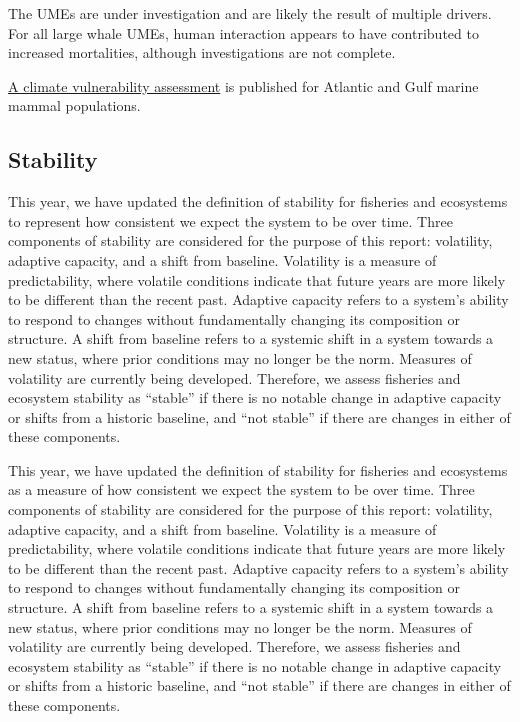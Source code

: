 \documentclass[
  10pt,
]{article}
\begin{document}
The UMEs are under investigation and are likely the result of multiple drivers. For all large whale UMEs, human interaction appears to have contributed to increased mortalities, although investigations are not complete.

\href{https://journals.plos.org/plosone/article?id=10.1371/journal.pone.0290643}{A climate vulnerability assessment} is published for Atlantic and Gulf marine mammal populations.

\newpage

\subsection{Stability}\label{stability}

This year, we have updated the definition of stability for fisheries and ecosystems to represent how consistent we expect the system to be over time. Three components of stability are considered for the purpose of this report: volatility, adaptive capacity, and a shift from baseline. Volatility is a measure of predictability, where volatile conditions indicate that future years are more likely to be different than the recent past. Adaptive capacity refers to a system's ability to respond to changes without fundamentally changing its composition or structure. A shift from baseline refers to a systemic shift in a system towards a new status, where prior conditions may no longer be the norm. Measures of volatility are currently being developed. Therefore, we assess fisheries and ecosystem stability as ``stable'' if there is no notable change in adaptive capacity or shifts from a historic baseline, and ``not stable'' if there are changes in either of these components.

This year, we have updated the definition of stability for fisheries and ecosystems as a measure of how consistent we expect the system to be over time. Three components of stability are considered for the purpose of this report: volatility, adaptive capacity, and a shift from baseline. Volatility is a measure of predictability, where volatile conditions indicate that future years are more likely to be different than the recent past. Adaptive capacity refers to a system's ability to respond to changes without fundamentally changing its composition or structure. A shift from baseline refers to a systemic shift in a system towards a new status, where prior conditions may no longer be the norm. Measures of volatility are currently being developed. Therefore, we assess fisheries and ecosystem stability as ``stable'' if there is no notable change in adaptive capacity or shifts from a historic baseline, and ``not stable'' if there are changes in either of these components.
\end{document}
